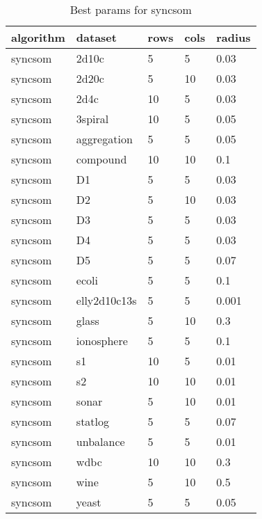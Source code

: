 \begin{table}[H]
\centering
\caption{Best params for syncsom}
\label{tab:params:syncsom}
\begin{tabular}{|l|l|l|l|l|}
\hline
algorithm & dataset & rows & cols & radius \\
\hline
syncsom & 2d10c & 5 & 5 & 0.03 \\
\hline
syncsom & 2d20c & 5 & 10 & 0.03 \\
\hline
syncsom & 2d4c & 10 & 5 & 0.03 \\
\hline
syncsom & 3spiral & 10 & 5 & 0.05 \\
\hline
syncsom & aggregation & 5 & 5 & 0.05 \\
\hline
syncsom & compound & 10 & 10 & 0.1 \\
\hline
syncsom & D1 & 5 & 5 & 0.03 \\
\hline
syncsom & D2 & 5 & 10 & 0.03 \\
\hline
syncsom & D3 & 5 & 5 & 0.03 \\
\hline
syncsom & D4 & 5 & 5 & 0.03 \\
\hline
syncsom & D5 & 5 & 5 & 0.07 \\
\hline
syncsom & ecoli & 5 & 5 & 0.1 \\
\hline
syncsom & elly2d10c13s & 5 & 5 & 0.001 \\
\hline
syncsom & glass & 5 & 10 & 0.3 \\
\hline
syncsom & ionosphere & 5 & 5 & 0.1 \\
\hline
syncsom & s1 & 10 & 5 & 0.01 \\
\hline
syncsom & s2 & 10 & 10 & 0.01 \\
\hline
syncsom & sonar & 5 & 10 & 0.01 \\
\hline
syncsom & statlog & 5 & 5 & 0.07 \\
\hline
syncsom & unbalance & 5 & 5 & 0.01 \\
\hline
syncsom & wdbc & 10 & 10 & 0.3 \\
\hline
syncsom & wine & 5 & 10 & 0.5 \\
\hline
syncsom & yeast & 5 & 5 & 0.05 \\
\hline
\end{tabular}
\end{table}
